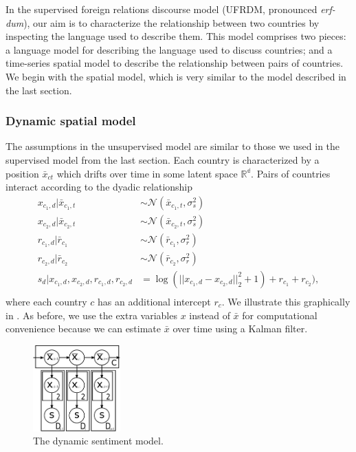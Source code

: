 In the supervised foreign relations discourse model (UFRDM, pronounced
\emph{erf-dum}), our aim is to characterize the relationship between
two countries by inspecting the language used to describe them.  This
model comprises two pieces: a language model for describing the
language used to discuss countries; and a time-series spatial model to
describe the relationship between pairs of countries.  We begin with
the spatial model, which is very similar to the model described in the
last section.

\subsubsection*{Dynamic spatial model}
The assumptions in the unsupervised model are similar to those we used
in the supervised model from the last section.  Each country is
characterized by a position $\bar x_{ct}$ which drifts over time in some
latent space $\mathbb{R^d}$.  Pairs of countries interact according to
the dyadic relationship
\begin{align}
  x_{c_1,d} | \bar x_{c_1,t} & \sim \mathcal{N}(\bar x_{c_1, t}, \sigma_s^2) \\
  x_{c_2,d} | \bar x_{c_2,t} & \sim \mathcal{N}(\bar x_{c_2, t}, \sigma_s^2) \\
  r_{c_1,d} | \bar r_{c_1} & \sim \mathcal{N}(\bar r_{c_1}, \sigma_r^2) \\
  r_{c_2,d} | \bar r_{c_2} & \sim \mathcal{N}(\bar r_{c_2}, \sigma_r^2) \\
  s_d | x_{c_1,d}, x_{c_2,d}, r_{c_1,d}, r_{c_2,d} & = \log( || x_{c_1,d} - x_{c_2,d} ||_2^2 + 1) + r_{c_1} + r_{c_2}), \\
\end{align}
where each country $c$ has an additional intercept $r_c$.
We illustrate this graphically in .  As before, we
use the extra variables $x$ instead of $\bar x$ for
computational convenience because we can estimate $\bar x$
over time using a Kalman filter.
\begin{figure}
  \includegraphics[width=0.3\textwidth]{chapter_foreign_relations/figures/countries_gm_no_text.pdf}
  \caption{The dynamic sentiment model.}
  \label{dyadic_chain}
\end{figure}


